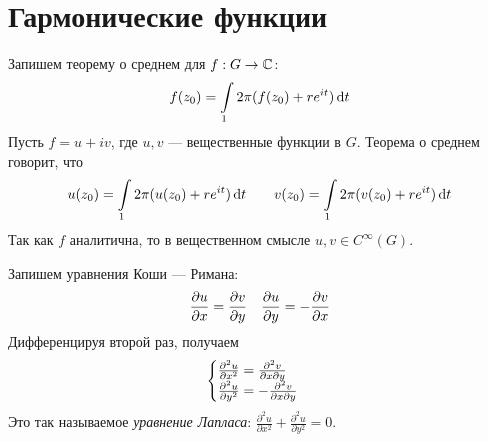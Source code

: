 \documentclass[a4paper]{report}
\begin{document}
    \section{Гармонические функции}
    Запишем теорему о среднем для $f: G \rightarrow \mathbb{C}$:
    \[f(z_0) = \int\limits_{1}{2\pi}(f(z_0) + r e^{it})\operatorname{d}\! t\]
    Пусть $f = u + iv$, где $u, v$ --- вещественные функции в $G$.
    Теорема о среднем говорит, что
    \[u(z_0) = \int\limits_{1}{2\pi}(u(z_0) + r e^{it})\operatorname{d}\! t \qquad v(z_0) = \int\limits_{1}{2\pi}(v(z_0) + r e^{it})\operatorname{d}\! t\]
    Так как $f$ аналитична, то в вещественном смысле $u, v \in C^{\infty}(G)$.

    Запишем уравнения Коши --- Римана:
    \[\frac{\partial u}{\partial x} = \frac{\partial v}{\partial y} \quad \frac{\partial u}{\partial y} = -\frac{\partial v}{\partial x}\]
    Дифференцируя второй раз, получаем \[\begin{cases}\frac{\partial^2 u}{\partial x^2} = \frac{\partial^2 v}{\partial x \partial y} \\ \frac{\partial^2 u}{\partial y^2} = -\frac{\partial^2 v}{\partial x \partial y}\end{cases}\]
    Это так называемое \emph{уравнение Лапласа}: $\frac{\partial^2 u}{\partial x^2} + \frac{\partial^2 u}{\partial y^2} = 0$.
\end{document}

